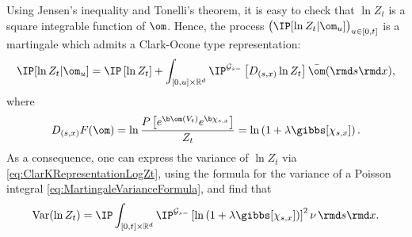Using Jensen's inequality and Tonelli's theorem, it is easy to check that $\ln Z_t$ is a square integrable function of $\om$. Hence, the process $\big(\IP[\ln Z_t|\om_u]\big)_{u\in[0,t]}$ is a martingale which admits a Clark-Ocone type representation:
\begin{equation} \label{eq:ClarKRepresentationLogZt}
\IP[\ln Z_t|\om_u] = \IP\left[\ln Z_t\right] + \int_{[0,u]\times\mathbb{R}^d} \IP^{\mathcal{G}_{s-}}\left[D_{(s,x)}\ln Z_t\right] \bar{\om}(\rmd s \rmd x),
\end{equation}
where
\[D_{(s,x)}F(\om) = \ln \frac{P\left[e^{\b\om(V_t)}e^{\b \chi_{s,x}}\right]}{Z_t}  = \ln \left(1+\lambda \gibbs[\chi_{s,x}]\right).\]
As a consequence, one can express the variance of $\ln Z_t$ via \eqref{eq:ClarKRepresentationLogZt}, using the formula for the variance of a Poisson integral \eqref{eq:MartingaleVarianceFormula}, and find that
\begin{equation} \label{eq:varFormula}
\mathrm{Var} (\ln Z_t) = \IP \int_{[0,t]\times\mathbb{R}^d} \IP^{\mathcal{G}_{s-}}\left[\ln \left(1+\lambda \gibbs[\chi_{s,x}]\right)\right]^2 \nu \hspace{0.5mm} \rmd s \rmd x.
\end{equation}

